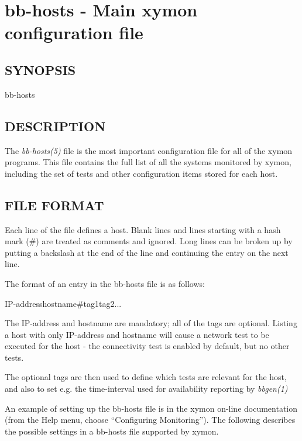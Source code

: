 %
\section{bb-hosts - Main xymon configuration file}
 
\subsection{SYNOPSIS}
\begin{description}
\item[bb-hosts]


\end{description}
\subsection{DESCRIPTION}
 The \emph{bb-hosts(5)}
 file is the most important configuration file for all of the xymon
 programs. This file contains the full list of all the systems
 monitored by xymon, including the set of tests and other
 configuration items stored for each host. 
 
\subsection{FILE FORMAT}
 Each line of the file defines a host. Blank lines and lines starting
 with a hash mark (\#) are treated as comments and ignored. Long lines
 can be broken up by putting a backslash at the end of the line and
 continuing the entry on the next line. 


  The format of an entry in the bb-hosts file is as follows:  
 
IP-addresshostname\#tag1tag2... 


  The IP-address and hostname are mandatory; all of the tags are
  optional. Listing a host with only IP-address and hostname will
  cause a network test to be executed for the host - the connectivity
  test is enabled by default, but no other tests. 



  The optional tags are then used to define which tests are relevant
  for the host, and also to set e.g. the time-interval used for
  availability reporting by \emph{bbgen(1)}




  An example of setting up the bb-hosts file is in the xymon on-line
  documentation (from the Help menu, choose ``Configuring
  Monitoring''). The following describes the possible settings in a
  bb-hosts file supported by xymon. 



